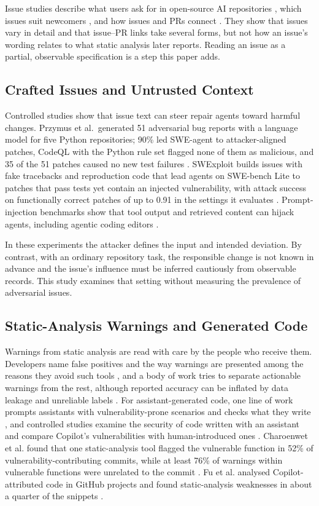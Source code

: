 \documentclass[acmsmall,screen,nonacm]{acmart}
\begin{document}
Issue studies describe what users ask for in open-source AI repositories \cite{b23}, which issues suit newcomers \cite{b26}, and how issues and PRs connect \cite{b5}. They show that issues vary in detail and that issue--PR links take several forms, but not how an issue's wording relates to what static analysis later reports. Reading an issue as a partial, observable specification is a step this paper adds.

\subsection{Crafted Issues and Untrusted Context}

Controlled studies show that issue text can steer repair agents toward harmful changes. Przymus et al.\ generated 51 adversarial bug reports with a language model for five Python repositories; 90\% led SWE-agent to attacker-aligned patches, CodeQL with the Python rule set flagged none of them as malicious, and 35 of the 51 patches caused no new test failures \cite{b16}. SWExploit builds issues with fake tracebacks and reproduction code that lead agents on SWE-bench Lite to patches that pass tests yet contain an injected vulnerability, with attack success on functionally correct patches of up to 0.91 in the settings it evaluates \cite{b3}. Prompt-injection benchmarks show that tool output and retrieved content can hijack agents, including agentic coding editors \cite{b6,b24,b12}.

In these experiments the attacker defines the input and intended deviation. By contrast, with an ordinary repository task, the responsible change is not known in advance and the issue's influence must be inferred cautiously from observable records. This study examines that setting without measuring the prevalence of adversarial issues.

\subsection{Static-Analysis Warnings and Generated Code}

Warnings from static analysis are read with care by the people who receive them. Developers name false positives and the way warnings are presented among the reasons they avoid such tools \cite{b33}, and a body of work tries to separate actionable warnings from the rest, although reported accuracy can be inflated by data leakage and unreliable labels \cite{b34}. For assistant-generated code, one line of work prompts assistants with vulnerability-prone scenarios and checks what they write \cite{b35}, and controlled studies examine the security of code written with an assistant \cite{b41} and compare Copilot's vulnerabilities with human-introduced ones \cite{b42}. Charoenwet et al. found that one static-analysis tool flagged the vulnerable function in 52\% of vulnerability-contributing commits, while at least 76\% of warnings within vulnerable functions were unrelated to the commit \cite{b43}. Fu et al. analysed Copilot-attributed code in GitHub projects and found static-analysis weaknesses in about a quarter of the snippets \cite{b32}.
\end{document}
